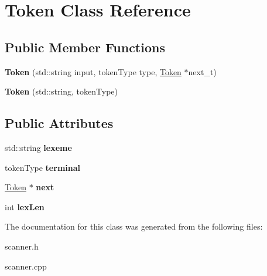 \hypertarget{classToken}{\section{Token Class Reference}
\label{classToken}
}
\subsection*{Public Member Functions}
\begin{DoxyCompactItemize}
\item 
\hypertarget{classToken_a859ef422b90e985ace9f7b4d6cba3e15}{{\bfseries Token} (std\-::string input, token\-Type type, \hyperlink{classToken}{Token} $\ast$next\-\_\-t)}\label{classToken_a859ef422b90e985ace9f7b4d6cba3e15}

\item 
\hypertarget{classToken_a2b1dd7856dd3608aa900015b4951127d}{{\bfseries Token} (std\-::string, token\-Type)}\label{classToken_a2b1dd7856dd3608aa900015b4951127d}

\end{DoxyCompactItemize}
\subsection*{Public Attributes}
\begin{DoxyCompactItemize}
\item 
\hypertarget{classToken_abbff29ede445ed4a8520580f12490832}{std\-::string {\bfseries lexeme}}\label{classToken_abbff29ede445ed4a8520580f12490832}

\item 
\hypertarget{classToken_a11b4722b5e4023d234d2017126de378b}{token\-Type {\bfseries terminal}}\label{classToken_a11b4722b5e4023d234d2017126de378b}

\item 
\hypertarget{classToken_a32f24a25af788c192e5b387dc8d67914}{\hyperlink{classToken}{Token} $\ast$ {\bfseries next}}\label{classToken_a32f24a25af788c192e5b387dc8d67914}

\item 
\hypertarget{classToken_a72a325300d284ac965460fb3a20d9567}{int {\bfseries lex\-Len}}\label{classToken_a72a325300d284ac965460fb3a20d9567}

\end{DoxyCompactItemize}


The documentation for this class was generated from the following files\-:\begin{DoxyCompactItemize}
\item 
scanner.\-h\item 
scanner.\-cpp\end{DoxyCompactItemize}
